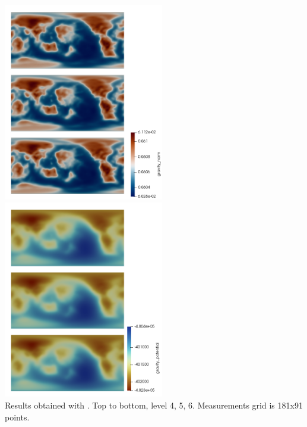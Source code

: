 \begin{center}
\includegraphics[width=7cm]{./images/benchmark_gravity/bench2/g}
\includegraphics[width=7cm]{./images/benchmark_gravity/bench2/U}\\
{\captionfont Results obtained with \aspect{}. Top to bottom, level 4, 5, 6.
Measurements grid is 181x91 points.}
\end{center}

